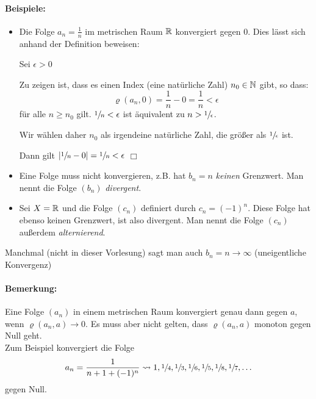 \paragraph{Beispiele:}
\begin{itemize}
	\item Die Folge $a_n=\frac 1 n$ im metrischen Raum $\mathbb{R}$ konvergiert gegen $0$. Dies lässt sich anhand der Definition beweisen:

	Sei $\epsilon>0$

	Zu zeigen ist, dass es einen Index (eine natürliche Zahl) $n_0\in\mathbb{N}$ gibt, so dass:
	\begin{equation*}
		\varrho(a_n,0)=\frac 1 n - 0=\frac 1 n <\epsilon
	\end{equation*}
	für alle $n\geq n_0$ gilt. $\sfrac 1 n<\epsilon$ ist äquivalent zu $n>\sfrac 1 \epsilon$.

	Wir wählen daher $n_0$ als irgendeine natürliche Zahl, die größer als $\sfrac 1 \epsilon$ ist.

	Dann gilt $|\sfrac 1 n-0|=\sfrac 1 n<\epsilon$ \hfill $\Box$

	\item Eine Folge muss nicht konvergieren, z.B. hat $b_n=n$ \emph{keinen} Grenzwert. Man nennt die Folge $(b_n)$ \emph{divergent}.

	\item Sei $X=\mathbb{R}$ und die Folge $(c_n)$ definiert durch $c_n=(-1)^n$. Diese Folge hat ebenso keinen Grenzwert, ist also divergent. Man nennt die Folge $(c_n)$ außerdem \emph{alternierend}.
\end{itemize}


Manchmal (nicht in dieser Vorlesung) sagt man auch $b_n=n\rightarrow \infty$ (uneigentliche Konvergenz)

\paragraph{Bemerkung:}
Eine Folge $(a_n)$ in einem metrischen Raum konvergiert genau dann gegen $a$, wenn $\varrho(a_n,a)\rightarrow 0$. Es muss aber nicht gelten, dass $\varrho(a_n,a)$ monoton gegen Null geht.\\
Zum Beispiel konvergiert die Folge
\begin{equation*}
	a_n=\frac{1}{n+1+(-1)^n} \rightsquigarrow 1,\sfrac14,\sfrac13,\sfrac16,\sfrac15,\sfrac18,\sfrac17,\ldots
\end{equation*}
gegen Null.


